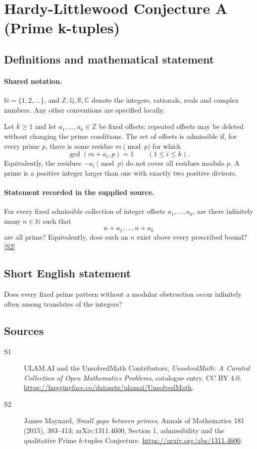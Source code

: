 \documentclass[11pt]{article}
\newcommand{\sref}[2]{\hyperlink{source:#1:#2}{[S#2]}}
\begin{document}
\section{Hardy-Littlewood Conjecture A (Prime k-tuples)}\label{statement}

\subsection{Definitions and mathematical statement}

\paragraph{Shared notation.}$\mathbb N=\{1,2,\ldots\}$, and $\mathbb Z,\mathbb Q,\mathbb R,\mathbb C$ denote the integers, rationals, reals and complex numbers. Any other conventions are specified locally.


Let \(k\ge1\) and let \(a_1,\ldots,a_k\in\mathbb Z\) be fixed
offsets; repeated offsets may be deleted without changing the prime
conditions. The set of offsets is admissible if, for every prime \(p\),
there is some residue \(m\pmod p\) for which
\[
                  \gcd(m+a_i,p)=1\qquad(1\le i\le k).
\]
Equivalently, the residues \(-a_i\pmod p\) do not cover all residues
modulo \(p\). A prime is a positive integer larger than one with
exactly two positive divisors.
\paragraph{Statement recorded in the supplied source.}
For every fixed admissible collection of integer offsets
\(a_1,\ldots,a_k\), are there infinitely many \(n\in\mathbb N\) such that
\[
                         n+a_1,\ldots,n+a_k
\]
are all prime? Equivalently, does such an \(n\) exist above every
prescribed bound? \sref{statement}{2}
\subsection{Short English statement}
Does every fixed prime pattern without a modular obstruction occur infinitely often among translates of the integers?
\subsection{Sources}
\begin{description}
\item[\hypertarget{source:statement:1}{S1}] ULAM.AI and the UnsolvedMath Contributors, \emph{UnsolvedMath: A Curated Collection of Open Mathematics Problems}, catalogue entry. CC BY 4.0. \url{https://huggingface.co/datasets/ulamai/UnsolvedMath}.
\item[\hypertarget{source:statement:2}{S2}] James Maynard, \emph{Small gaps between primes}, Annals of Mathematics 181 (2015), 383--413; arXiv:1311.4600, Section 1, admissibility and the qualitative Prime $k$-tuples Conjecture. \url{https://arxiv.org/abs/1311.4600}.
\end{description}
\label{end:statement}
\end{document}
